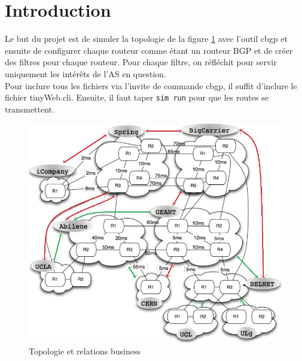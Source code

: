 \documentclass[a4paper, 12pt]{article}
\begin{document}


\section{Introduction}
Le but du projet est de simuler la topologie de la figure \ref{topo} avec l'outil cbgp et ensuite de configurer chaque routeur comme étant un routeur BGP et de créer des filtres pour chaque routeur.
Pour chaque filtre, on réfléchit pour servir uniquement les intérêts de l'AS en question.
\\

Pour inclure tous les fichiers via l'invite de commande cbgp, il suffit d'inclure le fichier tinyWeb.cli.
Ensuite, il faut taper \texttt{sim run} pour que les routes se transmettent.

\begin{figure}
 \begin{minipage}[c]{.75\linewidth}
  \centering
  \includegraphics[scale=0.65]{businesstiny.jpg}
 \end{minipage}
 \label{topo}
 \caption{Topologie et relations business}
\end{figure}
\end{document}

